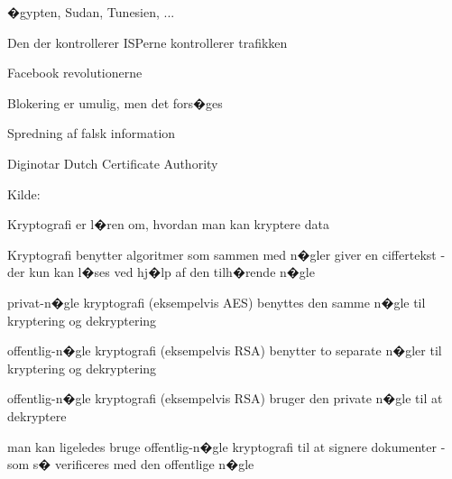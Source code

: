 \documentclass[20pt,landscape,a4paper,footrule]{foils}
\begin{document}

\begin{list1}
\item �gypten, Sudan, Tunesien, ...
\item Den der kontrollerer ISPerne kontrollerer trafikken
\item Facebook revolutionerne
\item Blokering er umulig, men det fors�ges
\item Spredning af falsk information
\item Diginotar Dutch Certificate Authority
\end{list1}

Kilde:
{\footnotesize{}}



\begin{list1}
\item Kryptografi er l�ren om, hvordan man kan kryptere data
\item Kryptografi benytter algoritmer som sammen med n�gler giver en
  ciffertekst - der kun kan l�ses ved hj�lp af den tilh�rende n�gle
\end{list1}



\begin{list1}
\item privat-n�gle kryptografi (eksempelvis AES) benyttes den samme
  n�gle til kryptering og dekryptering
\item offentlig-n�gle kryptografi (eksempelvis RSA) benytter to
  separate n�gler til kryptering og dekryptering
\end{list1}



\begin{list1}

\item offentlig-n�gle kryptografi (eksempelvis RSA) bruger den private
  n�gle til at dekryptere
\item man kan ligeledes bruge offentlig-n�gle kryptografi til at
  signere dokumenter - som s� verificeres med den offentlige n�gle
\end{list1}
\end{document}
